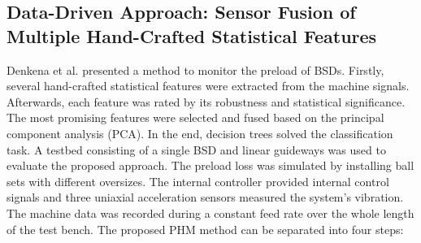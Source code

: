 \subsection{Data-Driven Approach: Sensor Fusion of Multiple Hand-Crafted Statistical Features}

Denkena et al. \cite{Denkena2021} presented a method to monitor the preload of BSDs. Firstly, several hand-crafted statistical features were extracted from the machine signals. Afterwards, each feature was rated by its robustness and statistical significance. The most promising features were selected and fused based on the principal component analysis (PCA). In the end, decision trees solved the classification task. A testbed consisting of a single BSD and linear guideways was used to evaluate the proposed approach. The preload loss was simulated by installing ball sets with different oversizes. The internal controller provided internal control signals and three uniaxial acceleration sensors measured the system's vibration. The machine data was recorded during a constant feed rate over the whole length of the test bench. The proposed PHM method can be separated into four steps:


